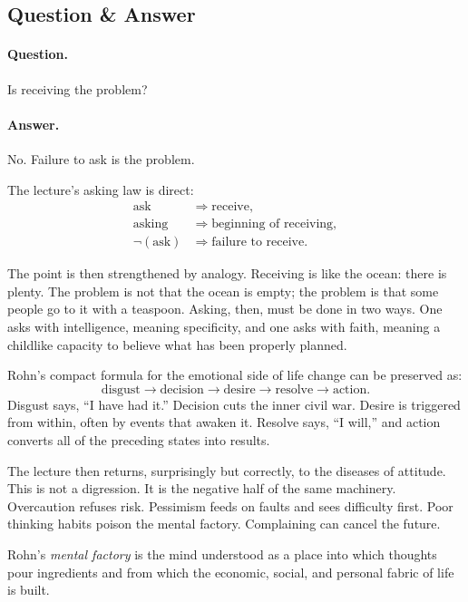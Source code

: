 \subsection{Question \& Answer}

\paragraph{Question.} Is receiving the problem?

\paragraph{Answer.} No. Failure to ask is the problem.

The lecture's asking law is direct:
\begin{align}
\text{ask} &\Rightarrow \text{receive},\\
\text{asking} &\Rightarrow \text{beginning of receiving},\\
\neg(\text{ask}) &\Rightarrow \text{failure to receive}.
\end{align}

The point is then strengthened by analogy. Receiving is like the ocean: there is plenty. The problem is not that the ocean is empty; the problem is that some people go to it with a teaspoon. Asking, then, must be done in two ways. One asks with intelligence, meaning specificity, and one asks with faith, meaning a childlike capacity to believe what has been properly planned.

Rohn's compact formula for the emotional side of life change can be preserved as:
\begin{equation}
\text{disgust} \to \text{decision} \to \text{desire} \to \text{resolve} \to \text{action}.
\end{equation}
Disgust says, ``I have had it.'' Decision cuts the inner civil war. Desire is triggered from within, often by events that awaken it. Resolve says, ``I will,'' and action converts all of the preceding states into results.

The lecture then returns, surprisingly but correctly, to the diseases of attitude. This is not a digression. It is the negative half of the same machinery. Overcaution refuses risk. Pessimism feeds on faults and sees difficulty first. Poor thinking habits poison the mental factory. Complaining can cancel the future.

\begin{definition}
Rohn's \emph{mental factory} is the mind understood as a place into which thoughts pour ingredients and from which the economic, social, and personal fabric of life is built.
\end{definition}

